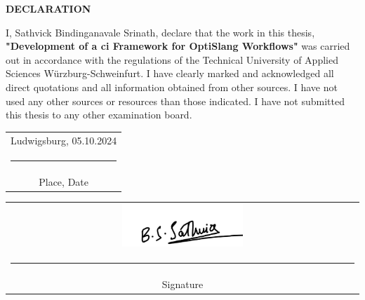 \vspace*{3cm}
\begin{center}
    \textbf{\Huge DECLARATION}
\end{center}
\vspace{2cm}
\begin{onehalfspace}
    I, Sathvick Bindinganavale Srinath, declare that the work in this thesis, \textbf{"Development of a \acrlong{ci} Framework for OptiSlang Workflows"} was carried out in accordance
with the regulations of the Technical University of Applied Sciences Würzburg-Schweinfurt. I have clearly marked and acknowledged all direct quotations and all information obtained from other sources. I have not used any
other sources or resources than those indicated. I have not submitted this thesis to any other examination board.
\end{onehalfspace}

\vspace{1cm}

\vspace*{4em}\noindent
\hfill%
\begin{tabular}[t]{c}
  Ludwigsburg, 05.10.2024\\\rule{10em}{0.4pt}\\ Place, Date
\end{tabular}%
\hfill%
\begin{tabular}[t]{c}
\includegraphics[width=0.35\textwidth]{Images/signature.pdf}\\\rule{10em}{0.4pt}\\ Signature
\end{tabular}%
\hfill\strut